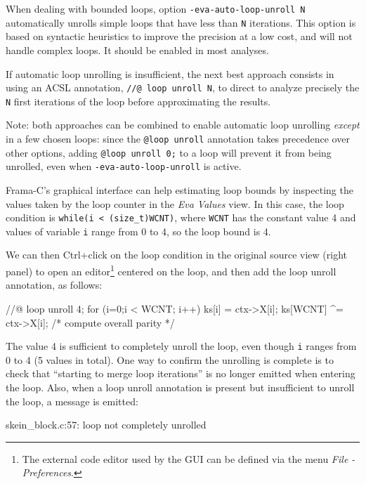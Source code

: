 \documentclass{frama-c-book}
\begin{document}
When dealing with bounded loops, option \verb+-eva-auto-loop-unroll N+
automatically unrolls simple loops that have less than \verb+N+ iterations.
This option is based on syntactic heuristics to improve the precision
at a low cost, and will not handle complex loops.
It should be enabled in most analyses.

If automatic loop unrolling is insufficient, the next best approach consists in
using an ACSL annotation, \verb+//@ loop unroll N+, to direct \Eva{} to analyze
precisely the \verb+N+ first iterations of the loop before approximating the
results.

Note: both approaches can be combined to enable automatic loop unrolling
{\em except} in a few chosen loops: since the \verb+@loop unroll+ annotation
takes precedence over other options, adding \verb+@loop unroll 0;+ to a loop
will prevent it from being unrolled, even when \verb+-eva-auto-loop-unroll+
is active.

Frama-C's graphical interface can help estimating loop bounds by inspecting the
values taken by the loop counter in the \emph{Eva Values} view.
In this case, the loop condition is \verb|while(i < (size_t)WCNT)|,
where \verb|WCNT| has the constant value 4 and values of variable \verb|i|
range from 0 to 4, so the loop bound is 4.

We can then Ctrl+click on the loop condition in the original source view
(right panel) to open an editor\footnote{The external code editor used by the GUI
  can be defined via the menu {\em File - Preferences}.} centered on the loop, and
then add the loop unroll annotation, as follows:

\begin{listing-nonumber}
  //@ loop unroll 4;
  for (i=0;i < WCNT; i++)
      {
      ks[i]     = ctx->X[i];
      ks[WCNT] ^= ctx->X[i];            /* compute overall parity */
      }
\end{listing-nonumber}

The value 4 is sufficient to completely unroll the loop, even though \verb|i|
ranges from 0 to 4 (5 values in total). One way to confirm the unrolling is
complete is to check that ``starting to merge loop iterations'' is no
longer emitted when entering the loop. Also, when a loop unroll annotation
is present but insufficient to unroll the loop, a message is emitted:

\begin{logsmath}
 skein_block.c:57: loop not completely unrolled
\end{logsmath}
\end{document}
